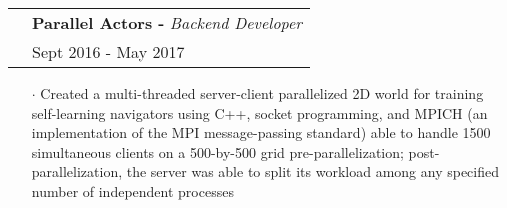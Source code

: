 \documentclass[a4paper, oneside, final]{scrartcl} %
\newcommand{\gray}{\rowcolor[gray]{.90}} %
\begin{document}
\begin{center}
  \begin{tabularx}{1.00\linewidth}{>{\raggedleft\scshape}p{0cm}X}
    \gray& \textbf{Parallel Actors -} \textit{Backend Developer}\\
    \gray& {Sept 2016 - May 2017}\\
  \end{tabularx}
  \begin{itemize}\itemsep-0.2cm
      \vspace{-0.1cm}
    \item[$\cdot$] Created a multi-threaded server-client parallelized 2D world for training self-learning navigators using C++, socket programming, and MPICH (an implementation of the MPI message-passing standard) able to handle 1500 simultaneous clients on a 500-by-500 grid pre-parallelization; post-parallelization, the server was able to split its workload among any specified number of independent processes  \\
  \end{itemize}





\end{center}
\end{document}
